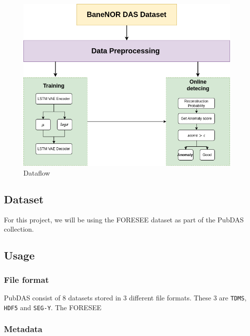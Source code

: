 \begin{figure}[h]
    \centering
    \includegraphics[scale=0.5]{figures/methodflow.png}
    \caption{Dataflow}
    \label{fig:dataflow}
\end{figure}

\subsection{Dataset}

For this project, we will be using the FORESEE dataset 
 as part of the PubDAS collection. \cite{spica2023pubdas}

\subsection{Usage}




\subsubsection{File format}

PubDAS consist of 8 datasets stored in 3 different file formats. These 3 are \texttt{TDMS}, \texttt{HDF5} and \texttt{SEG-Y}. 
The FORESEE

\subsubsection{Metadata}

